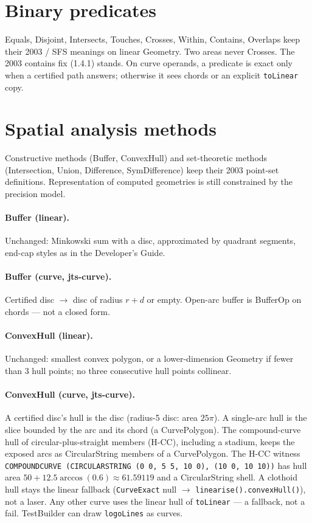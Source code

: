 \documentclass[11pt]{article}
\begin{document}
\section{Binary predicates}
Equals, Disjoint, Intersects, Touches, Crosses, Within, Contains,
Overlaps keep their 2003 / SFS meanings on linear Geometry. Two
areas never Crosses. The 2003 contains fix (1.4.1) stands. On curve
operands, a predicate is exact only when a certified path answers;
otherwise it sees chords or an explicit \texttt{toLinear} copy.

\section{Spatial analysis methods}
Constructive methods (Buffer, ConvexHull) and set-theoretic methods
(Intersection, Union, Difference, SymDifference) keep their 2003
point-set definitions. Representation of computed geometries is
still constrained by the precision model.

\paragraph{Buffer (linear).}
Unchanged: Minkowski sum with a disc, approximated by quadrant
segments, end-cap styles as in the Developer's Guide.

\paragraph{Buffer (curve, jts-curve).}
Certified disc $\rightarrow$ disc of radius $r+d$ or empty. Open-arc
buffer is BufferOp on chords --- not a closed form.

\paragraph{ConvexHull (linear).}
Unchanged: smallest convex polygon, or a lower-dimension Geometry if
fewer than 3 hull points; no three consecutive hull points collinear.

\paragraph{ConvexHull (curve, jts-curve).}
A certified disc's hull is the disc (radius-5 disc: area $25\pi$).
A single-arc hull is the slice bounded by the arc and its chord (a
CurvePolygon). The compound-curve hull of circular-plus-straight
members (H-CC), including a stadium, keeps the exposed arcs as
CircularString members of a CurvePolygon. The H-CC witness
\texttt{COMPOUNDCURVE (CIRCULARSTRING (0 0, 5 5, 10 0), (10 0, 10 10))}
has hull area $50 + 12.5\arccos(0.6) \approx 61.59119$ and a
CircularString shell. A clothoid hull stays the linear fallback
(\texttt{CurveExact} null $\rightarrow$
\texttt{linearise().convexHull()}), not a laser. Any other curve uses
the linear hull of \texttt{toLinear} --- a fallback, not a fail.
TestBuilder can draw \texttt{logoLines} as curves.
\end{document}
